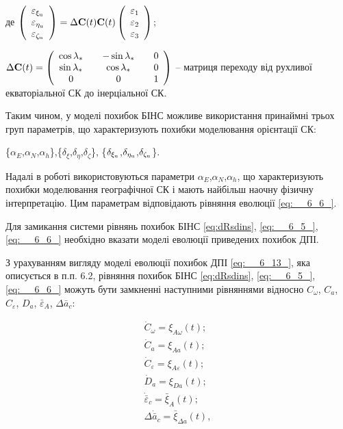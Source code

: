 де $\left(
\begin{array}{l} {\varepsilon _{\xi _{{\rm u}} } } \\ {\varepsilon _{\eta _{{\rm 
u}} } } \\ {\varepsilon _{\zeta _{{\rm u}} } } \end{array}\right)=\Delta {\bf C}(t){
\bf C}(t)\left(\begin{array}{l} {\varepsilon _{1} } \\ {\varepsilon _{2} } \\ {\varepsilon 
_{3} } \end{array}\right)$;

$\Delta {\bf C}(t)=\left(\begin{array}{ccccc} {\cos \lambda _{*} } & {} & {-\sin 
\lambda _{*} } & {} & {0} \\ {\sin \lambda _{*} } & {} & {\cos \lambda _{*} } & {} 
& {0} \\ {0} & {} & {0} & {} & {1} \end{array}\right)$ -- матриця переходу від рухливої  
екваторіальної СК до  інерціальної СК.

Таким чином, у моделі похибок БІНС можливе використання принаймні трьох груп параметрів, 
що характеризують похибки моделювання орієнтації СК:

\{$\alpha _{E} $,$\alpha _{N} $,$\alpha _{h} $\},\{$\delta _{\xi } $,$\delta _{\eta 
} $,$\delta _{\zeta } $\}, \{$\delta _{\xi _{{\rm u}} } $,$\delta _{\eta _{{\rm u}} 
} $,$\delta _{\zeta _{{\rm u}} } $\}.

Надалі в роботі використовуються параметри $\alpha _{E} $,$\alpha _{N} $,$\alpha 
_{h} $, що характеризують похибки  моделювання географічної СК і мають найбільш наочну 
фізичну інтерпретацію. Цим параметрам відповідають рівняння еволюції \eqref{eq:__6_6_}.

Для 
замикання системи рівнянь похибок БІНС \eqref{eq:dRsdins}, \eqref{eq:__6_5_}, 
\eqref{eq:__6_6_} необхідно вказати моделі еволюції приведених похибок ДПІ. 

З 
урахуванням вигляду моделі еволюції похибок ДПІ \eqref{eq:__6_13_}, яка описується  
в п.п. 6.2, рівняння похибок БІНС \eqref{eq:dRsdins}, \eqref{eq:__6_5_}, \eqref{eq:__6_6_} 
можуть бути замкненні  наступними  рівняннями відносно $C_{\omega } $, $C_{a} $, $C_{
\varepsilon } $, $D_{a} $, $\bar{\varepsilon }_{A} $, $\Delta \bar{a}_{c} $:

\begin{equation} \label{eq:__6_9_} \begin{array}{l} {\dot{C}_{\omega }^{} =\xi 
_{A\omega } (t);} \\ {\dot{C}_{a}^{} =\xi _{Aa} (t);} \\ {\dot{C}_{\varepsilon }^{} 
=\xi _{A\varepsilon } (t);} \\ {\dot{D}_{a} =\xi _{Da} (t);} \\ {\dot{\bar{\varepsilon 
}}_{c} =\bar{\xi }_{A} (t);} \\ {\Delta \dot{\bar{a}}_{c} =\bar{\xi }_{\Delta a} 
(t),} \end{array} \end{equation} 

